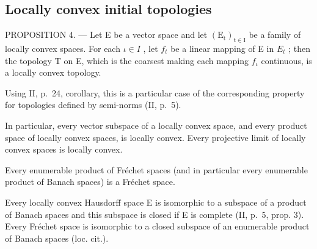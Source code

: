 \subsection{Locally convex initial topologies}

PROPOSITION 4. --- Let E be a vector space and let \((\mathrm{E}_{\mathrm{t}})_{\mathrm{t}\in\mathrm{I}}\) be a family of locally convex spaces. For each \(\iota\in I\) , let \(f_{t}\) be a linear mapping of E in \(E_{t}\) ; then the topology T on E, which is the coarsest making each mapping \(f_{\iota}\) continuous, is a locally convex topology.

Using II, p.~24, corollary, this is a particular case of the corresponding property for topologies defined by semi-norms (II, p.~5).

In particular, every vector subspace of a locally convex space, and every product space of locally convex spaces, is locally convex. Every projective limit of locally convex spaces is locally convex.

Every enumerable product of Fréchet spaces (and in particular every enumerable product of Banach spaces) is a Fréchet space.

Every locally convex Hausdorff space E is isomorphic to a subspace of a product of Banach spaces and this subspace is closed if E is complete (II, p.~5, prop. 3). Every Fréchet space is isomorphic to a closed subspace of an enumerable product of Banach spaces (loc. cit.).

